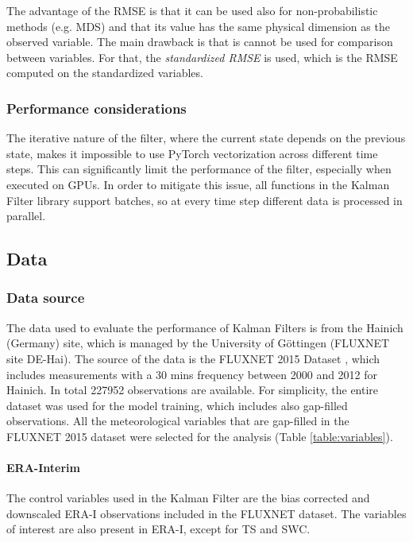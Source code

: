 \documentclass{article}
\let\Oldsubsection\subsection
\renewcommand{\subsection}{\FloatBarrier\Oldsubsection}
\begin{document}
The advantage of the RMSE is that it can be used also for non-probabilistic methods (e.g. MDS) and that its value has the same physical dimension as the observed variable. The main drawback is that is cannot be used for comparison between variables. For that, the \emph{standardized RMSE} is used, which is the RMSE computed on the standardized variables.

\subsubsection{Performance considerations} 

The iterative nature of the filter, where the current state depends on the previous state, makes it impossible to use PyTorch vectorization across different time steps. This can significantly limit the performance of the filter, especially when executed on GPUs. In order to  mitigate this issue, all functions in the Kalman Filter library support batches, so at every time step different data is processed in parallel.


\subsection{Data}

\subsubsection{Data source}

The data used to evaluate the performance of Kalman Filters is from the Hainich (Germany) site, which is managed by the University of Göttingen (FLUXNET site DE-Hai). The source of the data is  the FLUXNET 2015 Dataset \cite{pastorello_fluxnet2015_2020}, which includes measurements with a 30 mins frequency between 2000 and 2012 for Hainich. In total 227952 observations are available. For simplicity, the entire dataset was used for the model training, which includes also gap-filled observations.
All the meteorological variables that are gap-filled in the FLUXNET 2015 dataset were selected for the analysis (Table \ref{table:variables}).

\paragraph{ERA-Interim} The control variables used in the Kalman Filter are the bias corrected and downscaled ERA-I observations included in the FLUXNET dataset. The variables of interest are also present in ERA-I, except for TS and SWC.
\end{document}
